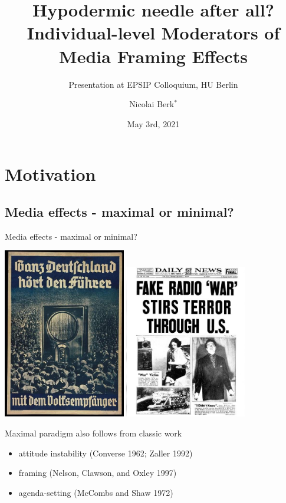 \documentclass[
  ignorenonframetext,
]{beamer}
\title{Hypodermic needle after all? Individual-level Moderators of Media
Framing Effects}
\subtitle{Presentation at EPSIP Colloquium, HU Berlin}
\author{Nicolai Berk\(^*\)}
\date{May 3rd, 2021}
\institute{\(^*\)RTG Dynamics/Humboldt Universität zu Berlin}
\providecommand{\tightlist}{%
  \setlength{\itemsep}{0pt}\setlength{\parskip}{0pt}}
\begin{document}
\frame{\titlepage}

\hypertarget{motivation}{%
\section{Motivation}\label{motivation}}

\hypertarget{media-effects---maximal-or-minimal}{%
\subsection{Media effects - maximal or
minimal?}\label{media-effects---maximal-or-minimal}}

\begin{frame}[allowframebreaks]{Media effects - maximal or minimal?}
\center

\includegraphics[width=0.4\textwidth,height=\textheight]{vis/volksempfanger.jpg}
\includegraphics[width=0.4\textwidth,height=\textheight]{vis/ufo_scares.jpg}

\flushleft

\framebreak

Maximal paradigm also follows from classic work

\begin{itemize}
\tightlist
\item
  attitude instability (Converse 1962; Zaller 1992)
\item
  framing (Nelson, Clawson, and Oxley 1997)
\item
  agenda-setting (McCombs and Shaw 1972)
\end{itemize}


\end{frame}
\end{document}
